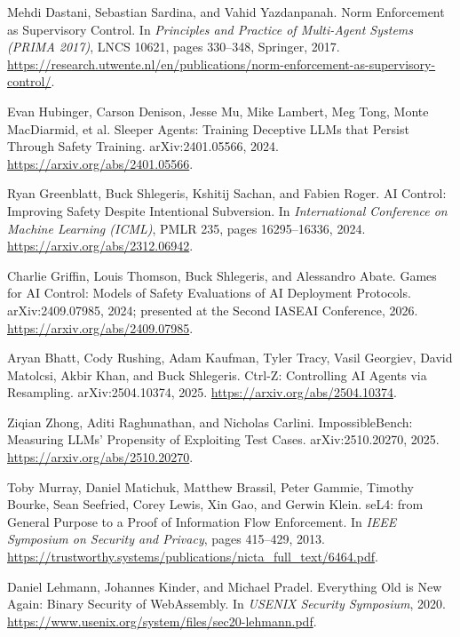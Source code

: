 Mehdi Dastani, Sebastian Sardina, and Vahid Yazdanpanah.
\newblock Norm Enforcement as Supervisory Control.
\newblock In \textit{Principles and Practice of Multi-Agent Systems (PRIMA 2017)}, LNCS 10621, pages 330--348, Springer, 2017.
\newblock \url{https://research.utwente.nl/en/publications/norm-enforcement-as-supervisory-control/}.

Evan Hubinger, Carson Denison, Jesse Mu, Mike Lambert, Meg Tong, Monte MacDiarmid, et al.
\newblock Sleeper Agents: Training Deceptive LLMs that Persist Through Safety Training.
\newblock arXiv:2401.05566, 2024.
\newblock \url{https://arxiv.org/abs/2401.05566}.

Ryan Greenblatt, Buck Shlegeris, Kshitij Sachan, and Fabien Roger.
\newblock AI Control: Improving Safety Despite Intentional Subversion.
\newblock In \textit{International Conference on Machine Learning (ICML)}, PMLR 235, pages 16295--16336, 2024.
\newblock \url{https://arxiv.org/abs/2312.06942}.

Charlie Griffin, Louis Thomson, Buck Shlegeris, and Alessandro Abate.
\newblock Games for AI Control: Models of Safety Evaluations of AI Deployment Protocols.
\newblock arXiv:2409.07985, 2024; presented at the Second IASEAI Conference, 2026.
\newblock \url{https://arxiv.org/abs/2409.07985}.

Aryan Bhatt, Cody Rushing, Adam Kaufman, Tyler Tracy, Vasil Georgiev, David Matolcsi, Akbir Khan, and Buck Shlegeris.
\newblock Ctrl-Z: Controlling AI Agents via Resampling.
\newblock arXiv:2504.10374, 2025.
\newblock \url{https://arxiv.org/abs/2504.10374}.

Ziqian Zhong, Aditi Raghunathan, and Nicholas Carlini.
\newblock ImpossibleBench: Measuring LLMs' Propensity of Exploiting Test Cases.
\newblock arXiv:2510.20270, 2025.
\newblock \url{https://arxiv.org/abs/2510.20270}.

Toby Murray, Daniel Matichuk, Matthew Brassil, Peter Gammie, Timothy Bourke, Sean Seefried, Corey Lewis, Xin Gao, and Gerwin Klein.
\newblock seL4: from General Purpose to a Proof of Information Flow Enforcement.
\newblock In \textit{IEEE Symposium on Security and Privacy}, pages 415--429, 2013.
\newblock \url{https://trustworthy.systems/publications/nicta_full_text/6464.pdf}.

Daniel Lehmann, Johannes Kinder, and Michael Pradel.
\newblock Everything Old is New Again: Binary Security of WebAssembly.
\newblock In \textit{USENIX Security Symposium}, 2020.
\newblock \url{https://www.usenix.org/system/files/sec20-lehmann.pdf}.

